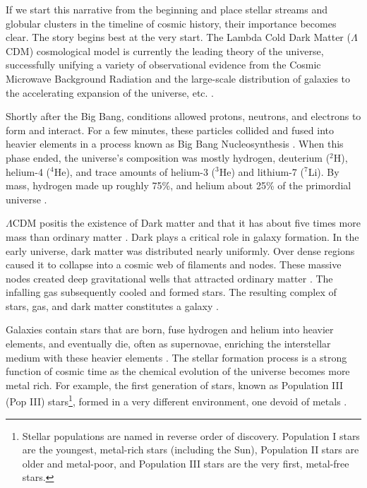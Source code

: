     If we start this narrative from the beginning and place stellar streams and globular clusters in the timeline of cosmic history, their importance becomes clear. The story begins best at the very start. The Lambda Cold Dark Matter ($\Lambda$CDM) cosmological model is currently the leading theory of the universe, successfully unifying a variety of observational evidence from the Cosmic Microwave Background Radiation and the large-scale distribution of galaxies to the accelerating expansion of the universe, etc. \citep{2001LRR.....4....1C,2022NewAR..9501659P}.

    Shortly after the Big Bang, conditions allowed protons, neutrons, and electrons to form and interact. For a few minutes, these particles collided and fused into heavier elements in a process known as Big Bang Nucleosynthesis \citep{2007ARNPS..57..463S}. When this phase ended, the universe's composition was mostly hydrogen, deuterium ($^2$H), helium-4 ($^4$He), and trace amounts of helium-3 ($^3$He) and lithium-7 ($^7$Li). By mass, hydrogen made up roughly 75\%, and helium about 25\% of the primordial universe \citep{1966ApJ...146..542P,2016RvMP...88a5004C}.

    $\Lambda$CDM positis the existence of Dark matter and that it has about five times more mass than ordinary matter \citep{2020A&A...641A...6P}. Dark plays a critical role in galaxy formation. In the early universe, dark matter was distributed nearly uniformly. Over dense regions caused it to collapse into a cosmic web of filaments and nodes. These massive nodes created deep gravitational wells that attracted ordinary matter \citep{1974ApJ...187..425P}. The infalling gas subsequently cooled and formed stars. The resulting complex of stars, gas, and dark matter constitutes a galaxy \citep{2008LNP...740.....P,2010gfe..book.....M}.

    Galaxies contain stars that are born, fuse hydrogen and helium into heavier elements, and eventually die, often as supernovae, enriching the interstellar medium with these heavier elements \citep{2019A&ARv..27....3M}. The stellar formation process is a strong function of cosmic time as the chemical evolution of the universe becomes more metal rich. For example, the first generation of stars, known as Population III (Pop III) stars\footnote{Stellar populations are named in reverse order of discovery. Population I stars are the youngest, metal-rich stars (including the Sun), Population II stars are older and metal-poor, and Population III stars are the very first, metal-free stars.}, formed in a very different environment, one devoid of metals \citep{2002Sci...295...93A,2005SSRv..117..445G,2013RPPh...76k2901B}. 

